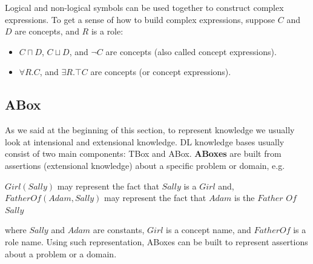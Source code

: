 Logical and non-logical symbols can be used together to construct complex expressions. To get a sense of how to build complex expressions, suppose $C$ and $D$ are concepts, and $R$ is a role:
\begin{itemize}
\item $C \sqcap D$, $C \sqcup D$, and $\neg C$ are concepts (also called concept expressions).
\item $\forall R.C$, and $\exists R.\top C$ are concepts (or concept expressions).
\end{itemize}


\subsection{ABox}
As we said at the beginning of this section, to represent knowledge we usually look at intensional and extensional knowledge. DL knowledge bases usually consist of two main components: TBox and ABox. \textbf{ABoxes} are built from assertions (extensional knowledge) about a specific problem or domain, e.g.
\begin{center}
$Girl(Sally)$ may represent the fact that $Sally$ is a $Girl$ and, \\
$FatherOf(Adam, Sally)$ may represent the fact that $Adam$ is the $Father$ $Of$ $Sally$
\end{center} 
where $Sally$ and $Adam$ are constants, $Girl$ is a concept name, and $FatherOf$ is a role name. Using such representation, ABoxes can be built to represent assertions about a problem or a domain.


